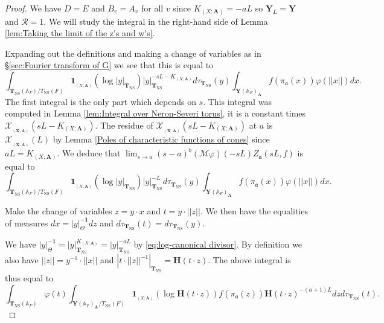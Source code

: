 \documentclass[a4paper,11pt,reqno]{amsart}
\newcommand{\A}{\mathbb{A}}
\DeclareMathOperator{\NS}{NS}
\DeclareMathOperator{\Eff}{\overline{Eff}}
\theoremstyle{definition}
\begin{document}
\begin{proof}
	We have $D = E$ and $B_v = A_v$ for all $v$ since $K_{(X ; \mathbf{A})} = -aL$ so $\mathbf{Y}_L = \mathbf{Y}$ and $\mathcal{R} = 1$. We will study the integral in the right-hand side of Lemma \ref{lem:Taking the limit of the z's and w's}.
	
	Expanding out the definitions and making a change of variables as in \S\ref{sec:Fourier transform of G} we see that this is equal to 
	\[
		\int_{\mathbf{T}_{\NS}(\A_F)/T_{\NS}(F)} \mathbf{1}_{\Eff_{(X ; \mathbf{A})}}(\log |y|_{\mathbf{T}_{\NS}}) |y|_{\mathbf{T}_{\NS}}^{- sL - K_{(X ; \mathbf{A})}} d\tau_{\mathbf{T}_{\NS}}(y)\int_{\mathbf{Y}(\A_F)_{\mathbf{A}}} f(\pi_{\mathfrak{a}}(x)) \varphi(||x||) d x.
	\]
	The first integral is the only part which depends on $s$. This integral was computed in Lemma \ref{lem:Integral over Neron-Severi torus}, it is a constant times $\mathcal{X}_{\Eff_{(\mathbf{X}; \mathbf{A})}}(sL - K_{(X ; \mathbf{A})})$. The residue of $\mathcal{X}_{\Eff_{(\mathbf{X}; \mathbf{A})}}(sL - K_{(X ; \mathbf{A})})$ at $a$ is $\mathcal{X}_{\Eff_{(\mathbf{X}; \mathbf{A})}}(L)$ by Lemma \ref{Poles of characteristic functions of cones} since $aL = K_{(X ; \mathbf{A})}$. We deduce that $\lim_{s \to a} (s - a)^b (\mathcal{M} \varphi)(-sL) Z_{\mathfrak{a}}(s L, f)$ is equal to
	\[
	\int_{\mathbf{T}_{\NS}(\A_F)/T_{\NS}(F)} \mathbf{1}_{\Eff_{(X ; \mathbf{A})}}(\log |y|_{\mathbf{T}_{\NS}}) |y|_{\mathbf{T}_{\NS}}^{- L} d\tau_{\mathbf{T}_{\NS}}(y)\int_{\mathbf{Y}(\A_F)_{\mathbf{A}}} f(\pi_{\mathfrak{a}}(x)) \varphi(||x||) d x.
	\]
	
	Make the change of variables $z = y \cdot x$ and $t = y \cdot ||z||$. We then have the equalities of measures $dx = |y|_{\Theta}^{-\mathbf{1}} dz$ and $d\tau_{\mathbf{T}_{\NS}}(t) = d\tau_{\mathbf{T}_{\NS}}(y)$. 
	
	We have $|y|_{\Theta}^{-\mathbf{1}} = |y|_{\mathbf{T}_{\NS}}^{K_{(X ; \mathbf{A})}} = |y|_{\mathbf{T}_{\NS}}^{- a L}$ by \eqref{eq:log-canonical divisor}. By definition we also have $||z|| = y^{-1} \cdot ||x||$ and $\left|t \cdot ||z||^{-1}\right|_{\mathbf{T}_{\NS}} = \mathbf{H}(t \cdot z)$. The above integral is thus equal to
	\[
	\int_{\mathbf{T}_{\NS}(\A_F)} \varphi(t)
	\int_{\mathbf{Y}(\A_F)_{\mathbf{A}}/T_{\NS}(F)} \mathbf{1}_{\Eff_{(X ; \mathbf{A})}}(\log \mathbf{H}(t \cdot z)) f(\pi_{\mathfrak{a}}(z)) \mathbf{H}(t \cdot z)^{- (a + 1)L} d z d\tau_{\mathbf{T}_{\NS}}(t).
	\]
	

\end{proof}
\end{document}
